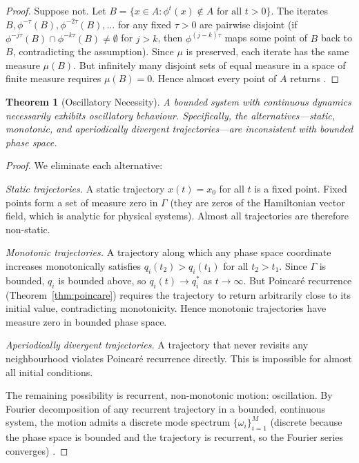 \documentclass[11pt,twocolumn,a4paper]{article}
\newtheorem{theorem}{Theorem}[section]
\theoremstyle{definition}
\theoremstyle{remark}
\begin{document}
\begin{proof}
Suppose not. Let $B = \{x \in A : \phi^t(x) \notin A \text{ for all } t > 0\}$. The iterates $B, \phi^{-\tau}(B), \phi^{-2\tau}(B), \ldots$ for any fixed $\tau > 0$ are pairwise disjoint (if $\phi^{-j\tau}(B) \cap \phi^{-k\tau}(B) \neq \emptyset$ for $j > k$, then $\phi^{(j-k)\tau}$ maps some point of $B$ back to $B$, contradicting the assumption). Since $\mu$ is preserved, each iterate has the same measure $\mu(B)$. But infinitely many disjoint sets of equal measure in a space of finite measure requires $\mu(B) = 0$. Hence almost every point of $A$ returns \citep{poincare1890, arnold1989}.
\end{proof}

\begin{theorem}[Oscillatory Necessity]
\label{thm:oscillatory}
A bounded system with continuous dynamics necessarily exhibits oscillatory behaviour. Specifically, the alternatives---static, monotonic, and aperiodically divergent trajectories---are inconsistent with bounded phase space.
\end{theorem}

\begin{proof}
We eliminate each alternative:

\emph{Static trajectories.} A static trajectory $x(t) = x_0$ for all $t$ is a fixed point. Fixed points form a set of measure zero in $\Gamma$ (they are zeros of the Hamiltonian vector field, which is analytic for physical systems). Almost all trajectories are therefore non-static.

\emph{Monotonic trajectories.} A trajectory along which any phase space coordinate increases monotonically satisfies $q_i(t_2) > q_i(t_1)$ for all $t_2 > t_1$. Since $\Gamma$ is bounded, $q_i$ is bounded above, so $q_i(t) \to q_i^*$ as $t \to \infty$. But Poincar{\'e} recurrence (Theorem~\ref{thm:poincare}) requires the trajectory to return arbitrarily close to its initial value, contradicting monotonicity. Hence monotonic trajectories have measure zero in bounded phase space.

\emph{Aperiodically divergent trajectories.} A trajectory that never revisits any neighbourhood violates Poincar{\'e} recurrence directly. This is impossible for almost all initial conditions.

The remaining possibility is recurrent, non-monotonic motion: oscillation. By Fourier decomposition of any recurrent trajectory in a bounded, continuous system, the motion admits a discrete mode spectrum $\{\omega_i\}_{i=1}^M$ (discrete because the phase space is bounded and the trajectory is recurrent, so the Fourier series converges) \citep{arnold1989}.
\end{proof}
\end{document}
